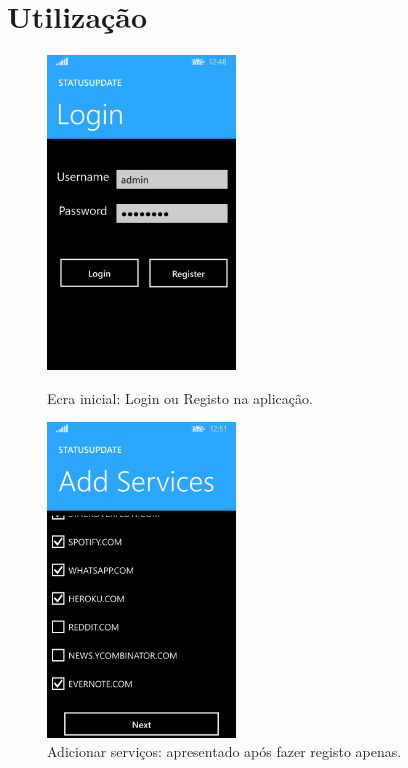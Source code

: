 \documentclass[12pt]{article}
\begin{document}
\section{Utilização} 
\begin{figure}[ht!]
\centering
\parbox{5cm}{
\includegraphics[width=5cm]{1.png}
\caption{Ecra inicial:  Login ou Registo na aplicação.}
}
\qquad
\begin{minipage}{5cm}
\includegraphics[width=5cm]{2.png}
\caption{Adicionar serviços: apresentado após fazer registo apenas.}
\end{minipage}
\end{figure}
\end{document}
